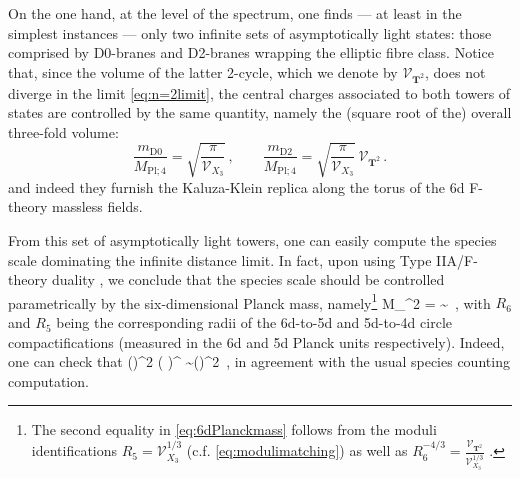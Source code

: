On the one hand, at the level of the spectrum, one finds --- at least in the simplest instances --- only two infinite sets of asymptotically light states: those comprised by D0-branes and D2-branes wrapping the elliptic fibre class. Notice that, since the volume of the latter 2-cycle, which we denote by $\mathcal{V}_{\mathbf{T}^2}$, does not diverge in the limit \eqref{eq:n=2limit}, the central charges associated to both towers of states are controlled by the same quantity, namely the (square root of the) overall three-fold volume:
%
\begin{equation}\label{eq:massesD0D2Fthylimit}
	\frac{m_{\text{D0}}}{M_{\text{Pl;}\, 4}}  = \sqrt{\frac{\pi}{\mathcal{V}_{X_3}}}\, , \qquad \frac{m_{\text{D2}}}{M_{\text{Pl;}\, 4}} = \sqrt{\frac{\pi}{\mathcal{V}_{X_3}}}\, \mathcal{V}_{\mathbf{T}^2}\, .
\end{equation}
%
and indeed they furnish the Kaluza-Klein replica along the torus of the 6d F-theory massless fields. 
	
From this set of asymptotically light towers, one can easily compute the species scale dominating the infinite distance limit. In fact, upon using Type IIA/F-theory duality \cite{Lee:2019wij}, we conclude that the species scale should be controlled parametrically by the six-dimensional Planck mass, namely\footnote{The second equality in \eqref{eq:6dPlanckmass} follows from the moduli identifications $R_5 = \mathcal{V}_{X_3}^{1/3}$ (c.f. \eqref{eq:modulimatching}) as well as $R_6^{-4/3}=\frac{\mathcal{V}_{\mathbf{T}^2}}{\mathcal{V}_{X_3}^{1/3}}$ \cite{Corvilain:2018lgw}.}
%
\beq \label{eq:6dPlanckmass}
	M_{}^2 \simeq{} =  \sim {}\, ,
\eeq
%
with $R_6$ and $R_5$ being the corresponding radii of the 6d-to-5d and 5d-to-4d circle compactifications (measured in the 6d and 5d Planck units respectively). Indeed, one can check that
%
\beq\label{eq:6dPlanckscale}
	\left(\right)^2 \simeq \left( \right)^{} \sim \left(\right)^2\, ,
\eeq
%
in agreement with the usual species counting computation. 
	
